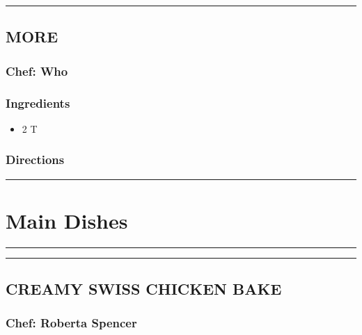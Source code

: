 \documentclass[
]{book}
\providecommand{\tightlist}{%
  \setlength{\itemsep}{0pt}\setlength{\parskip}{0pt}}
\begin{document}
\begin{center}\rule{0.5\linewidth}{0.5pt}\end{center}

\hypertarget{more-1}{%
\section*{MORE}\label{more-1}}


\hypertarget{chef-who-1}{%
\subsection*{Chef: Who}\label{chef-who-1}}


\hypertarget{ingredients-38}{%
\subsection*{Ingredients}\label{ingredients-38}}


\begin{itemize}
\tightlist
\item
  2 T
\end{itemize}

\hypertarget{directions-38}{%
\subsection*{Directions}\label{directions-38}}


\begin{center}\rule{0.5\linewidth}{0.5pt}\end{center}

\hypertarget{Main}{%
\chapter{Main Dishes}\label{Main}}

\begin{center}\rule{0.5\linewidth}{0.5pt}\end{center}

\begin{center}\rule{0.5\linewidth}{0.5pt}\end{center}

\hypertarget{creamy-swiss-chicken-bake}{%
\section*{CREAMY SWISS CHICKEN BAKE}\label{creamy-swiss-chicken-bake}}


\hypertarget{chef-roberta-spencer-12}{%
\subsection*{Chef: Roberta Spencer}\label{chef-roberta-spencer-12}}
\end{document}
